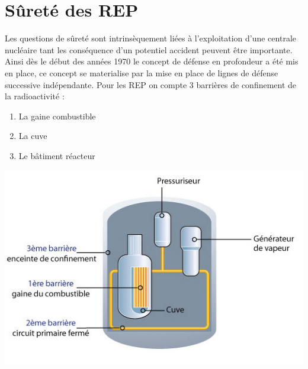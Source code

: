 \documentclass[a4paper,11pt]{report}    %
\begin{document}
\section{Sûreté des REP}
Les questions de sûreté sont intrinsèquement liées à l'exploitation d'une centrale nucléaire tant les conséquence d'un potentiel accident peuvent être importante. Ainsi dès le début des années 1970 le concept de défense en profondeur a été mis en place, ce concept se materialise par la mise en place de lignes de défense successive indépendante. Pour les REP on compte 3 barrières de confinement de la radioactivité :
 \\
\begin{minipage}[c]{0.3\linewidth}
	\begin{enumerate}
		\item La gaine combustible
		\item La cuve
		\item Le bâtiment réacteur
	\end{enumerate}
\end{minipage} \hfill
\begin{minipage}[c]{0.65\linewidth}
	\centering
	\includegraphics[width=0.7\linewidth]{figure/irsn_barriere-confinement.png}
\end{minipage}
\vspace{0.5cm}
\end{document}
